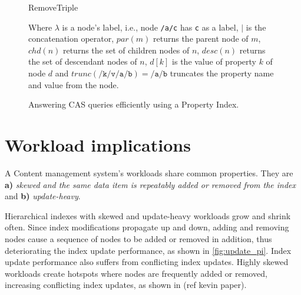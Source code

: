 \documentclass[abstracton,12pt]{scrreprt}
\begin{document}
\begin{figure}
\begin{multicols}{2}
        \begin{algorithm}[H]
            \label{algo:remove_triple_pi}
            \caption{RemoveTriple}
            \DontPrintSemicolon
            \begin{scriptsize}
            \end{scriptsize}
        \end{algorithm}
    \end{multicols}
    \begin{footnotesize}
        Where $\lambda$ is a node's label, i.e., node \texttt{/a/c} has \texttt{c} as a label,
        $|$ is the concatenation operator,
        $par(m)$ returns the parent node of $m$,
        $chd(n)$ returns the set of children nodes of $n$,
        $desc(n)$ returns the set of descendant nodes of $n$,
        $d[k]$ is the value of property $k$ of node $d$
        and $trunc(\texttt{/k/v/a/b}) = \texttt{/a/b}$ truncates the property name and value from the node.
    \end{footnotesize}
    \caption{Answering CAS queries efficiently using a Property Index.}
\end{figure}

\section{Workload implications}

A Content management system's workloads share common properties.
They are \textbf{a)} \textit{skewed and the same data item is repeatably added or removed from the index} and
\textbf{b)} \textit{update-heavy}.

Hierarchical indexes with skewed and update-heavy workloads grow and shrink often.
Since index modifications propagate up and down, adding and removing nodes cause a sequence of nodes to be added or removed in addition, thus deteriorating the index update performance, as shown in \cref{fig:update_pi}.
Index update performance also suffers from conflicting index updates.
Highly skewed workloads create hotspots where nodes are frequently added or removed, increasing conflicting index updates, as shown in (ref kevin paper).
\end{document}
